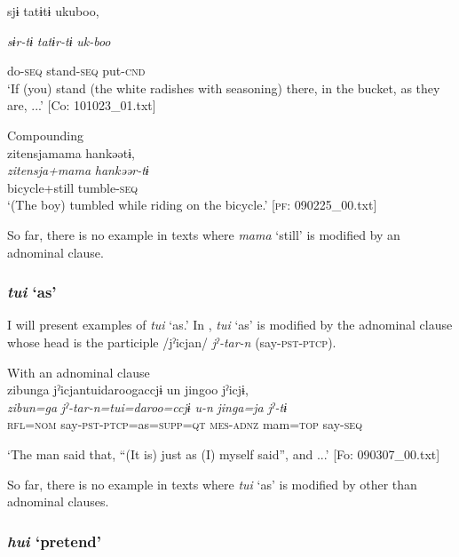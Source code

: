       sjɨ  tatɨtɨ  ukuboo,

      \textit{sɨr-tɨ}  \textit{tatɨr-tɨ}  \textit{uk-boo}

      do-\textsc{seq}  stand-\textsc{seq}  put-\textsc{cnd}\\
\glt ‘If (you) stand (the white radishes with seasoning) there, in the bucket, as they are, ...’ [Co: 101023\_01.txt]
\z

\ex Compounding\\
{\TM}
\glll  {\textbar}zitensja{\textbar}mama  hankəətɨ,\\
\textit{zitensja+mama}  \textit{hankəər-tɨ}\\
bicycle+still  tumble-\textsc{seq}\\
\glt ‘(The boy) tumbled while riding on the bicycle.’ [\textsc{pf}: 090225\_00.txt]
\z

So far, there is no example in texts where \textit{mama} ‘still’ is modified by an adnominal clause.

\subsubsection{ \textit{tui} ‘as’}

I will present examples of \textit{tui} ‘as.’ In , \textit{tui} ‘as’ is modified by the adnominal clause whose head is the participle /jˀicjan/ \textit{jˀ-tar-n} (say-\textsc{pst}-\textsc{ptcp}).

\ea\label{ex:6-28}
 With an adnominal clause\\

{\TM}
\glll {\textbar}zibunga{\textbar}  jˀicjantuidaroogaccjɨ  un  jingoo  jˀicjɨ,\\
\textit{zibun=ga}  \textit{jˀ-tar-n=tui=daroo=ccjɨ}  \textit{u-n}  \textit{jinga=ja}  \textit{jˀ-tɨ}\\

    \textsc{rfl}=\textsc{nom}  say-\textsc{pst}-\textsc{ptcp}=as=\textsc{supp}=\textsc{qt}  \textsc{mes}-\textsc{adnz}  mam=\textsc{top}  say-\textsc{seq}

\glt    ‘The man said that, “(It is) just as (I) myself said”, and ...’ [Fo: 090307\_00.txt]
\z

So far, there is no example in texts where \textit{tui} ‘as’ is modified by other than adnominal clauses.

\subsubsection{ \textit{hui} ‘pretend’}

